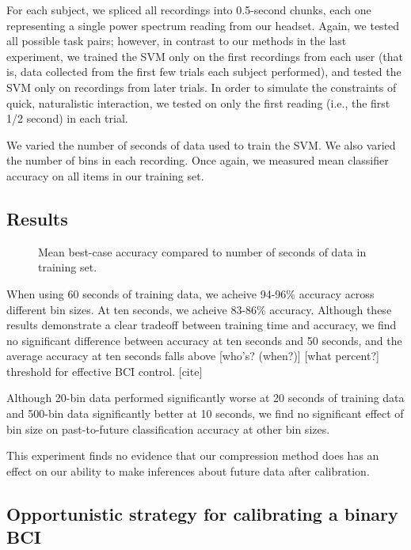For each subject, we spliced all recordings into 0.5-second chunks, each one representing a single power spectrum reading from our headset. Again, we tested all possible task pairs; however, in contrast to our methods in the last experiment, we trained the SVM only on the first recordings from each user (that is, data collected from the first few trials each subject performed), and tested the SVM only on recordings from later trials. In order to simulate the constraints of quick, naturalistic interaction, we tested on only the first reading (i.e., the first 1/2 second) in each trial. 

We varied the number of seconds of data used to train the SVM. We also varied the number of bins in each recording. Once again, we measured mean classifier accuracy on all items in our training set.

\subsection{Results}

\begin{figure}[!h]
  \vspace{-0.2cm}
  \centering
   {}
  \caption{Mean best-case accuracy compared to number of seconds of data in training set.}
  \label{fig:fig2}
  \vspace{-0.1cm}
\end{figure}

When using 60 seconds of training data, we acheive 94-96\% accuracy across different bin sizes. At ten seconds, we acheive 83-86\% accuracy. Although these results demonstrate a clear tradeoff between training time and accuracy, we find no significant difference between accuracy at ten seconds and 50 seconds, and the average accuracy at ten seconds falls above [who's? (when?)] [what percent?] threshold for effective BCI control. [cite]

Although 20-bin data performed significantly worse at 20 seconds of training data and 500-bin data significantly better at 10 seconds, we find no significant effect of bin size on past-to-future classification accuracy at other bin sizes.

This experiment finds no evidence that our compression method does has an effect on our ability to make inferences about future data after calibration.

\subsection{Opportunistic strategy for calibrating a binary BCI}

